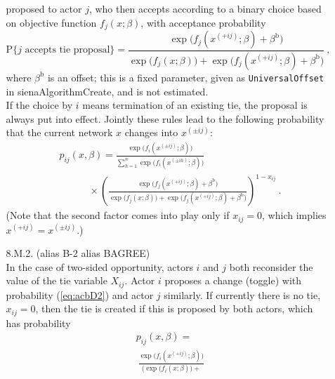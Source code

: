 \documentclass[a4paper,12pt,fleqn]{article}
\renewcommand{\P}{\mbox{P}}
\newcommand{\nm}[1]{\textsf{\small #1}}
\begin{document}
\begin{enumerate}
\begin{itemize}
      proposed to actor $j$, who then accepts according to a binary choice
      based on objective function $f_j(x; \beta)$, with
      acceptance probability
      \[
      \P\{j \text{ accepts tie proposal}\} =
                   \frac{\exp\big(f_j(x^{(+ij)}; \beta) + \beta^\text{b} \big)}
        {\exp\big(f_j(x; \beta)\big) + \exp\big(f_j(x^{(+ij)}; \beta) + \beta^\text{b} \big)} \ ,
      \]
      where $ \beta^\text{b} $ is an offset; this is a fixed parameter,
      given as \texttt{UniversalOffset} in \nm{sienaAlgorithmCreate},
      and is not estimated.\\
      If the choice by $i$ means termination of an existing tie,
      the proposal is always put into effect.
      Jointly these rules lead to the following probability
      that the current network $x$ changes into $x^{(\pm ij)}$:
      \begin{equation}
      \begin{split}
      &  p_{ij}(x, \beta) =
          \frac{\exp\big(f_i(x^{(\pm ij)}; \beta)\big)}
         {\sum_{h=1}^n \exp\big(f_i(x^{(\pm ih)}; \beta)\big)}\\
       & \hspace{3em} \times
        \left(\frac{\exp\big(f_j(x^{(+ ij)}; \beta) + \beta^\text{b}  \big)}
          {\exp\big(f_j(x; \beta)\big) + \exp\big(f_j(x^{(+ ij)}; \beta) + \beta^\text{b} \big)}
                         \right)^{1-x_{ij}}
          \ .   \label{eq:acbM}
      \end{split}
      \end{equation}
      (Note that the second factor comes into play only if $x_{ij} = 0$,
      which implies $x^{(+ ij)} = x^{(\pm ij)}$.)
      \item[\hspace*{3em}8.M.2.] (alias B-2 alias BAGREE) \\
      In the case of two-sided opportunity, actors $i$ and $j$
      both reconsider the value of the tie variable $X_{ij}$.
      Actor $i$ proposes a change (toggle) with probability (\ref{eq:acbD2})
      and actor $j$ similarly.
      If currently there is no tie, $x_{ij} = 0$, then the tie is created
      if this is proposed by both actors, which has probability
      \begin{subequations}
      \begin{flalign}
        & p_{ij}(x, \beta) =   \label{eq:pM2}         \\
        & \ \frac{\exp\big(f_i(x^{(+ ij)}; \beta)\big)}
         {\Big(\exp\big(f_i(x; \beta)\big) + \nonumber
}
\end{flalign}
\end{subequations}
\end{itemize}
\end{enumerate}
\end{document}
